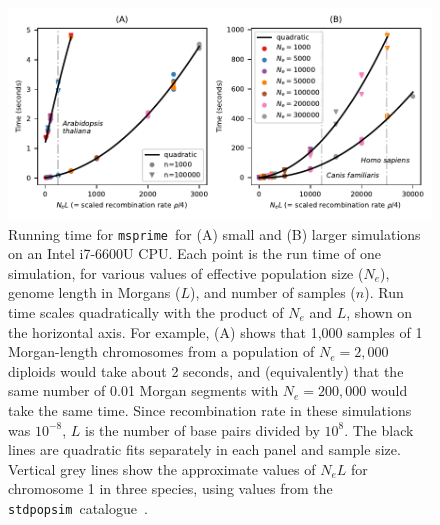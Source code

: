 \documentclass{article}
\newcommand{\msprime}[0]{\texttt{msprime}}
\newcommand{\stdpopsim}[0]{\texttt{stdpopsim}}
\begin{document}
\begin{figure}
\begin{center}
    \includegraphics[width=\textwidth]{figures/ancestry-perf}
\end{center}
\caption{\label{fig-ancestry-perf}
    Running time for \msprime\
    for (A) small and (B) larger simulations on an Intel i7-6600U CPU.
    Each point is the run time of one simulation,
    for various values of effective population size ($N_e$),
    genome length in Morgans ($L$), and number of samples ($n$).
    Run time scales quadratically with the product of $N_e$ and $L$,
    shown on the horizontal axis. For example, (A) shows that
    1,000 samples of 1 Morgan-length chromosomes
    from a population of $N_e=2,000$ diploids
    would take about 2 seconds, and (equivalently) that the same number of
    0.01 Morgan segments with $N_e= 200,000$ would take the same time.
    Since recombination rate in these simulations was $10^{-8}$,
    $L$ is the number of base pairs divided by $10^8$.
    The black lines are quadratic fits separately in each panel
    and sample size. Vertical grey lines show the approximate values of
    $N_e L$ for chromosome 1 in three species, using values from
    the \stdpopsim\ catalogue~\citep{adrion2020community}.
}
\end{figure}

\end{document}
